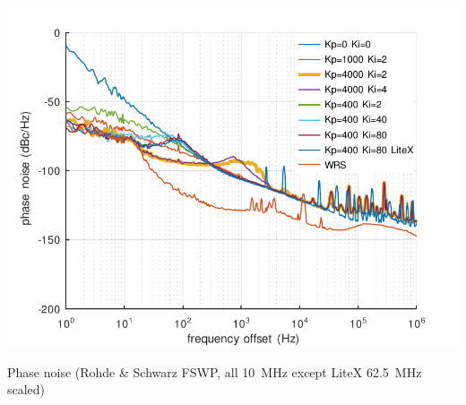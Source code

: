 \documentclass[compress,10pt,aspectratio=169]{beamer}
\begin{document}
\begin{frame}[fragile]
\begin{minipage}[t]{\linewidth}
\begin{minipage}{.49\linewidth}
\end{minipage}
\begin{minipage}{.49\linewidth}
\includegraphics[width=\linewidth]{phase_noise_litex.pdf}

Phase noise (Rohde \& Schwarz FSWP, all 10~MHz except LiteX 62.5~MHz
scaled)
\end{minipage}
\end{minipage}


\end{frame}
\end{document}

